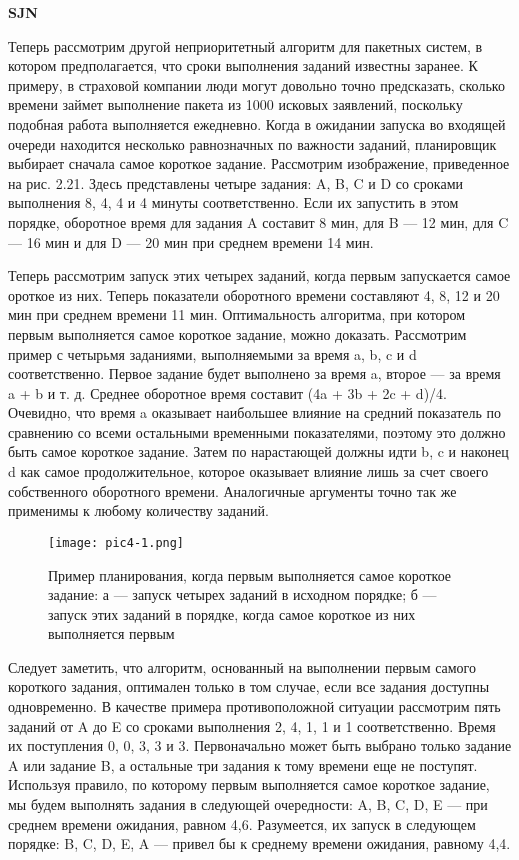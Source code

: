 \textbf{SJN}

Теперь рассмотрим другой неприоритетный алгоритм для пакетных систем, в котором
предполагается, что сроки выполнения заданий известны заранее. К примеру, в страховой компании люди могут довольно точно предсказать, сколько времени займет выполнение пакета из 1000 исковых заявлений, поскольку подобная работа выполняется ежедневно. Когда в ожидании запуска во входящей очереди находится несколько равнозначных по важности заданий, планировщик выбирает сначала самое короткое задание. Рассмотрим изображение, приведенное на рис. 2.21. Здесь представлены четыре задания: A, B, C и D со сроками выполнения 8, 4, 4 и 4 минуты соответственно. Если их запустить в этом порядке, оборотное время для задания A составит 8 мин, для B — 12 мин, для C — 16 мин и для D — 20 мин при среднем времени 14 мин.

Теперь рассмотрим запуск этих четырех заданий, когда первым запускается самое  ороткое из них. Теперь показатели оборотного времени составляют 4, 8, 12 и 20 мин при среднем времени 11 мин. Оптимальность алгоритма, при котором первым выполняется самое короткое задание, можно доказать. Рассмотрим пример с четырьмя заданиями, выполняемыми за время a, b, c и d соответственно. Первое задание будет выполнено за время a, второе — за время a + b и т. д. Среднее оборотное время составит (4a + 3b + 2c + d)/4. Очевидно, что время a оказывает наибольшее влияние на средний показатель по сравнению со всеми остальными временными показателями, поэтому это должно быть самое короткое задание. Затем по нарастающей должны идти b, c и наконец d как самое продолжительное, которое оказывает влияние лишь за счет своего собственного оборотного времени. Аналогичные аргументы точно так же применимы к любому количеству заданий.

\begin{figure}[!h]\center
   \texttt{[image: pic4-1.png]}
   \caption{Пример планирования, когда первым выполняется самое короткое задание:
      а — запуск четырех заданий в исходном порядке; б — запуск этих заданий в порядке,
      когда самое короткое из них выполняется первым}
\end{figure}

Следует заметить, что алгоритм, основанный на выполнении первым самого короткого
задания, оптимален только в том случае, если все задания доступны одновременно.
В качестве примера противоположной ситуации рассмотрим пять заданий от A до E
со сроками выполнения 2, 4, 1, 1 и 1 соответственно. Время их поступления 0, 0, 3, 3
и 3. Первоначально может быть выбрано только задание A или задание B, а остальные
три задания к тому времени еще не поступят. Используя правило, по которому первым
выполняется самое короткое задание, мы будем выполнять задания в следующей очередности: A, B, C, D, E — при среднем времени ожидания, равном 4,6. Разумеется, их
запуск в следующем порядке: B, C, D, E, A — привел бы к среднему времени ожидания,
равному 4,4.
\newline

